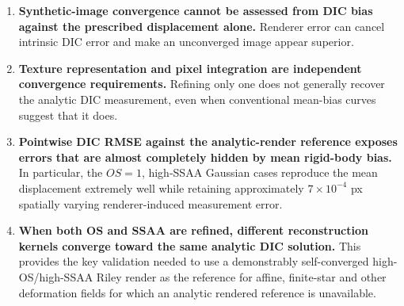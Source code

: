 \documentclass[11pt,a4paper]{article}
\begin{document}
\begin{enumerate}[leftmargin=*,itemsep=0.8em]
\item \textbf{Synthetic-image convergence cannot be assessed from DIC bias against the prescribed displacement alone.} Renderer error can cancel intrinsic DIC error and make an unconverged image appear superior.

\item \textbf{Texture representation and pixel integration are independent convergence requirements.} Refining only one does not generally recover the analytic DIC measurement, even when conventional mean-bias curves suggest that it does.

\item \textbf{Pointwise DIC RMSE against the analytic-render reference exposes errors that are almost completely hidden by mean rigid-body bias.} In particular, the $OS=1$, high-SSAA Gaussian cases reproduce the mean displacement extremely well while retaining approximately $7\times10^{-4}$ px spatially varying renderer-induced measurement error.

\item \textbf{When both OS and SSAA are refined, different reconstruction kernels converge toward the same analytic DIC solution.} This provides the key validation needed to use a demonstrably self-converged high-OS/high-SSAA Riley render as the reference for affine, finite-star and other deformation fields for which an analytic rendered reference is unavailable.
\end{enumerate}
\end{document}
